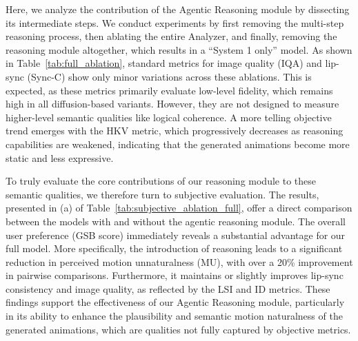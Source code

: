 Here, we analyze the contribution of the Agentic Reasoning module by dissecting its intermediate steps. We conduct experiments by first removing the multi-step reasoning process, then ablating the entire Analyzer, and finally, removing the reasoning module altogether, which results in a ``System 1 only'' model. As shown in Table~\ref{tab:full_ablation}, standard metrics for image quality (IQA) and lip-sync (Sync-C) show only minor variations across these ablations. This is expected, as these metrics primarily evaluate low-level fidelity, which remains high in all diffusion-based variants. However, they are not designed to measure higher-level semantic qualities like logical coherence. A more telling objective trend emerges with the HKV metric, which progressively decreases as reasoning capabilities are weakened, indicating that the generated animations become more static and less expressive.
\par
To truly evaluate the core contributions of our reasoning module to these semantic qualities, we therefore turn to subjective evaluation. The results, presented in (a) of Table~\ref{tab:subjective_ablation_full}, offer a direct comparison between the models with and without the agentic reasoning module. The overall user preference (GSB score) immediately reveals a substantial advantage for our full model. More specifically, the introduction of reasoning leads to a significant reduction in perceived motion unnaturalness (MU), with over a 20\% improvement in pairwise comparisons. Furthermore, it maintains or slightly improves lip-sync consistency and image quality, as reflected by the LSI and ID metrics. These findings support the effectiveness of our Agentic Reasoning module, particularly in its ability to enhance the plausibility and semantic motion naturalness of the generated animations, which are qualities not fully captured by objective metrics.

